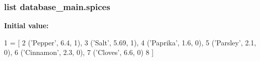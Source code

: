 \subsubsection[{\texorpdfstring{spices}{spices}}]{\setlength{\rightskip}{0pt plus 5cm}list database\+\_\+main.\+spices}\hypertarget{namespacedatabase__main_a5c9eb9043541b4a2ddee70e65511fca3}{}\label{namespacedatabase__main_a5c9eb9043541b4a2ddee70e65511fca3}
{\bfseries Initial value\+:}
\begin{DoxyCode}
1 = [
2             (\textcolor{stringliteral}{'Pepper'}, 6.4, 1),
3             (\textcolor{stringliteral}{'Salt'}, 5.69, 1),
4             (\textcolor{stringliteral}{'Paprika'}, 1.6, 0),
5             (\textcolor{stringliteral}{'Parsley'}, 2.1, 0),
6             (\textcolor{stringliteral}{'Cinnamon'}, 2.3, 0),
7             (\textcolor{stringliteral}{'Cloves'}, 6.6, 0) 
8          ]
\end{DoxyCode}

